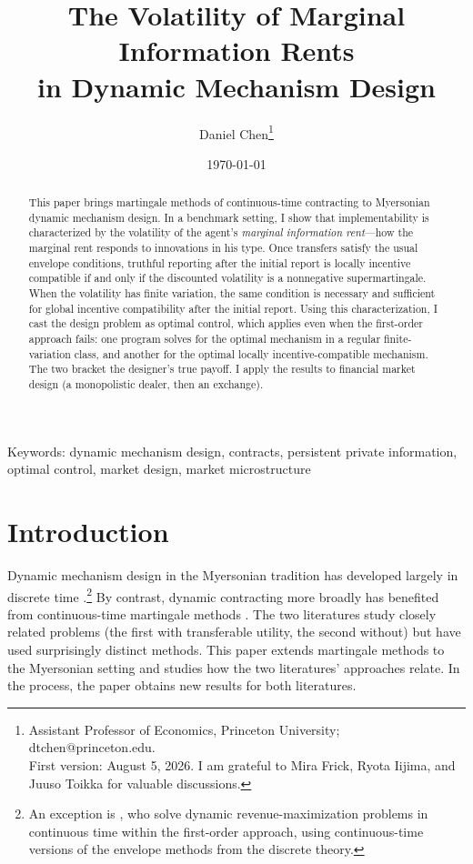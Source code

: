 \documentclass[12pt]{article}
\title{{The Volatility of Marginal Information Rents}\\ {in Dynamic Mechanism Design}}
\author{Daniel Chen\footnote{Assistant Professor of Economics, Princeton
University; dtchen@princeton.edu. \\
First version: August 5, 2026. I am grateful
to Mira Frick, Ryota Iijima, and Juuso Toikka for valuable discussions.}}
\date{\today}
\begin{document}
\hypersetup{pageanchor=false}
\maketitle

\begin{abstract}
This paper brings martingale methods of continuous-time contracting
to Myersonian dynamic mechanism design. In a benchmark setting, I show that
implementability is characterized by the volatility of the agent's
\emph{marginal information rent}---how the marginal rent responds to
innovations in his type. Once transfers satisfy the usual envelope
conditions, truthful reporting after the initial report is locally incentive compatible if
and only if the discounted volatility is a nonnegative
supermartingale. When the volatility has finite variation, the same
condition is necessary and sufficient for global incentive
compatibility after the initial report. Using this characterization, I cast the design problem
as optimal control, which applies even when the first-order approach
fails: one program solves for the optimal mechanism in a regular finite-variation class, and another for the optimal locally incentive-compatible
mechanism. The two bracket the designer’s true payoff. I apply the
results to financial market design (a monopolistic dealer, then an exchange). 
\end{abstract}
\bigskip

{Keywords:} dynamic mechanism design, contracts, persistent private information,
optimal control, market design, market microstructure
\thispagestyle{empty}
\clearpage


\newpage
\pagestyle{plain}
\hypersetup{pageanchor=true}

\section{Introduction}

Dynamic mechanism design in the Myersonian tradition has developed largely in discrete time
\citep{courty2000sequential,battaglini2005longterm,eso2007optimal,pavan2014dynamic}.\footnote{An
exception is \citet{bergemann2015dynamic}, who solve dynamic
revenue-maximization problems in continuous time within the first-order
approach, using continuous-time versions of the envelope methods from
the discrete theory.} By contrast, dynamic contracting more broadly has benefited from continuous-time martingale methods \citep{demarzo2006optimal,sannikov2008,williams2011persistent}.
The two literatures study closely related problems (the first with transferable utility, the second without)
but have used surprisingly distinct methods. This paper extends martingale
methods to the Myersonian setting and studies how the two literatures' approaches relate. In the process, the paper obtains new results for both literatures.
\end{document}
